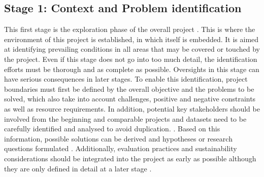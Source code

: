 \subsection{Stage 1: Context and Problem identification}
This first stage is the exploration phase of the overall project \autocite{citizenscience.govBasicStepsYour}. This is where the environment of this project is established, in which itself is embedded. It is aimed at identifying prevailing conditions in all areas that may be covered or touched by the project. Even if this stage does not go into too much detail, the identification efforts must be thorough and as complete as possible. Oversights in this stage can have serious consequences in later stages. To enable this identification, project boundaries must first be defined by the overall objective and the problems to be solved, which also take into account challenges, positive and negative constraints as well as resource requirements. In addition, potential key stakeholders should be involved from the beginning and comparable projects and datasets need to be carefully identified and analysed to avoid duplication. \autocite{citizenscience.govBasicStepsYour,fraislCitizenScienceEnvironmental2022,minkmanCitizenScienceWater2015}. Based on this information, possible solutions can be derived and hypotheses or research questions formulated \autocite{fraislCitizenScienceEnvironmental2022, silvertownNewDawnCitizen2009}. Additionally, evaluation practices and sustainability considerations should be integrated into the project as early as possible although they are only defined in detail at a later stage \autocite{fraislCitizenScienceEnvironmental2022}.

